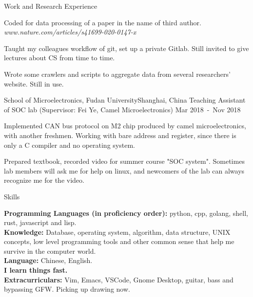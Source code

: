 \documentclass{resume} %
\begin{document}
\begin{rSection}{Work and Research Experience}
\begin{rSubsection}
\item Coded for data processing of a paper in the name of third author. \hfill {\em www.nature.com/articles/s41699-020-0147-x }
\item Taught my colleagues workflow of git, set up a private Gitlab. Still invited to give lectures about CS from time to time.
\item Wrote some crawlers and scripts to aggregate data from several researchers' website. Still in use.


\end{rSubsection}



\begin{rSubsection}
{School of Microelectronics, Fudan University}{Shanghai, China}
{Teaching Assistant of SOC lab (Supervisor: Fei Ye, Camel Microelectronics)}
{Mar 2018\ -\ Nov 2018}

\item Implemented CAN bus protocol on M2 chip produced by camel microelectronics, with another freshmen. Working with bare address and register, since there is only a C compiler and no operating system.
\item Prepared textbook, recorded video for summer course "SOC system". Sometimes lab members will ask me for help on linux, and newcomers of the lab can always recognize me for the video.
 
\end{rSubsection}



\end{rSection}




\begin{rSection}{Skills}

{\bf Programming Languages (in proficiency order):} python, cpp, golang, shell, rust, javascript and lisp.
\\ {\bf Knowledge:} Database, operating system, algorithm, data structure, UNIX concepts, low level programming tools and other common sense that help me survive in the computer world.
\\ {\bf Language:} Chinese, English.
\\ {\bf I learn things fast.}
\\ {\bf Extracurriculars:} Vim, Emacs, VSCode, Gnome Desktop, guitar, bass and bypassing GFW. Picking up drawing now.

\end{rSection}
\end{document}
